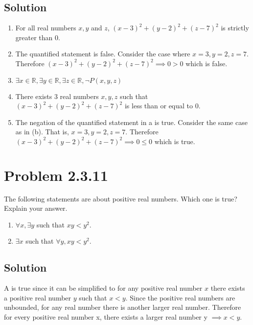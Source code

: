 \documentclass[12pt]{extarticle}
\begin{document}
\subsection*{Solution}
\begin{enumerate}[label=(\alph*)]
	\item For all real numbers $x,y$ and $z$, $(x - 3)^2 + (y - 2)^2 + (z - 7)^2$ is strictly greater than 0.
	\item The quantified statement is false. Consider the case where $x=3, y=2, z=7$. Therefore $(x - 3)^2 + (y - 2)^2 + (z - 7)^2 \implies 0 > 0$ which is false.
	\item $\exists x \in \mathbb{R}, \exists y \in \mathbb{R}, \exists z \in \mathbb{R}, \lnot P(x, y, z)$
	\item There exists 3 real numbers $x,y,z$ such that $(x - 3)^2 + (y - 2)^2 + (z - 7)^2$ is less than or equal to 0.
	\item The negation of the quantified statement in a is true. Consider the same case as in (b). That is, $x=3, y=2, z=7$. Therefore $(x - 3)^2 + (y - 2)^2 + (z - 7)^2 \implies 0 \leq 0$ which is true.
\end{enumerate}

\section*{Problem 2.3.11}

The following statements are about positive real numbers. Which one is true? Explain your answer. 
\begin{enumerate}[label=(\alph*)]
	\item $\forall x, \exists y$ such that $xy < y^2$. 
	\item $\exists x$ such that $\forall y, xy < y^2$.
\end{enumerate}

\subsection*{Solution}

A is true since it can be simplified to for any positive real number $x$ there exists a positive real number $y$ such that $x < y$. Since the positive real numbers are unbounded, for any real number there is another larger real number. Therefore for every positive real number x, there exists a larger real number y $\implies x < y$.

\end{document}
